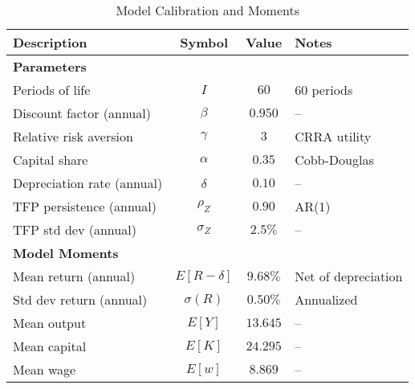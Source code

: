 \begin{table}[ht]
\centering
\caption{Model Calibration and Moments}
\label{tab:calibration}
\begin{tabular}{l c c l}
\toprule
\textbf{Description} & \textbf{Symbol} & \textbf{Value} & \textbf{Notes} \\
\midrule
\multicolumn{4}{l}{\textbf{Parameters}} \\
Periods of life                     & $I$              & $60$           & 60 periods \\
Discount factor (annual)            & $\beta$          & $0.950$       & -- \\
Relative risk aversion              & $\gamma$         & $3$           & CRRA utility \\
Capital share                       & $\alpha$         & $0.35$       & Cobb-Douglas \\
Depreciation rate (annual)          & $\delta$         & $0.10$       & -- \\
TFP persistence (annual)            & $\rho_Z$         & $0.90$       & AR(1) \\
TFP std dev (annual)                & $\sigma_Z$       & $2.5\%$ & -- \\
\midrule
\multicolumn{4}{l}{\textbf{Model Moments}} \\
Mean return (annual)                & $E[R-\delta]$    & $9.68\%$  & Net of depreciation \\
Std dev return (annual)             & $\sigma(R)$      & $0.50\%$   & Annualized \\
Mean output                         & $E[Y]$           & $13.645$   & -- \\
Mean capital                        & $E[K]$           & $24.295$      & -- \\
Mean wage                           & $E[w]$           & $8.869$      & -- \\
\bottomrule
\end{tabular}
\end{table}
